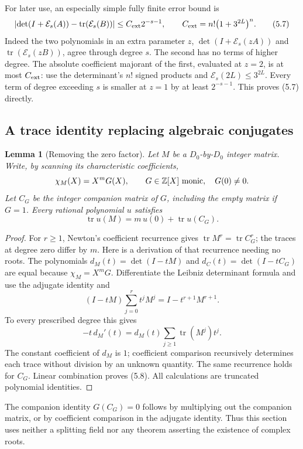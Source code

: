 \documentclass[11pt]{article}
\newtheorem{lemma}[theorem]{Lemma}
\theoremstyle{definition}
\newcommand{\Z}{\mathbb Z}
\newcommand{\tr}{\operatorname{tr}}
\newcommand{\Exp}{\mathcal E}
\begin{document}
For later use, an especially simple fully finite error bound is
\[
 \left|\det(I+\Exp_s(A))-\tr(\Exp_s(B))\right|
 \le C_{\rm ext}2^{-s-1},\qquad
 C_{\rm ext}=n!\bigl(1+3^{2L}\bigr)^n. \tag{5.7}
\]
Indeed the two polynomials in an extra parameter \(z\),
\(\det(I+\Exp_s(zA))\) and \(\tr(\Exp_s(zB))\), agree through degree
\(s\). The second has no terms of higher degree.
The absolute coefficient majorant of the first, evaluated at \(z=2\),
is at most \(C_{\rm ext}\): use the determinant's \(n!\) signed
products and \(\Exp_s(2L)\le3^{2L}\).
Every term of degree exceeding \(s\) is smaller at \(z=1\) by at
least \(2^{-s-1}\). This proves (5.7) directly.

\subsection{A trace identity replacing algebraic conjugates}

\begin{lemma}[Removing the zero factor]\label{lem:newton}
Let \(M\) be a \(D_0\)-by-\(D_0\) integer matrix. Write, by scanning
its characteristic coefficients,
\[
 \chi_M(X)=X^mG(X),\qquad G\in\Z[X]\ \hbox{monic},\quad G(0)\ne0.
\]
Let \(C_G\) be the integer companion matrix of \(G\), including the empty
matrix if \(G=1\). Every rational polynomial \(u\) satisfies
\[
 \tr u(M)=m\,u(0)+\tr u(C_G). \tag{5.8}
\]
\end{lemma}
\begin{proof}
For \(r\ge1\), Newton's coefficient recurrence gives
\(\tr M^r=\tr C_G^r\); the traces at degree zero differ by \(m\).
Here is a derivation of that recurrence needing no roots.
The polynomials \(d_M(t)=\det(I-tM)\) and
\(d_C(t)=\det(I-tC_G)\) are equal because \(\chi_M=X^mG\).
Differentiate the Leibniz determinant formula and use the adjugate
identity and
\[
 (I-tM)\sum_{j=0}^r t^jM^j=I-t^{r+1}M^{r+1}.
\]
To every prescribed degree this gives
\[
 -t\,d_M'(t)=d_M(t)\sum_{j\ge1}\tr(M^j)t^j.
\]
The constant coefficient of \(d_M\) is \(1\); coefficient comparison
recursively determines each trace without division by an unknown
quantity. The same recurrence holds for \(C_G\). Linear combination
proves (5.8). All calculations are truncated polynomial identities.
\end{proof}

The companion identity \(G(C_G)=0\) follows by multiplying out the
companion matrix, or by coefficient comparison in the adjugate identity.
Thus this section uses neither a splitting field nor any theorem
asserting the existence of complex roots.
\end{document}
